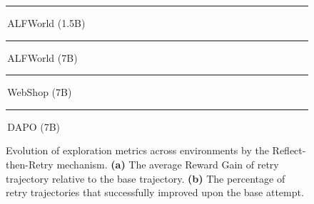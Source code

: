 \begin{figure}
    \vspace{0.4em}
    {\scriptsize
    \textcolor{blue}{\rule[0.35ex]{1.1em}{1.3pt}}\,ALFWorld (1.5B)\quad
    \textcolor{red}{\rule[0.35ex]{1.1em}{1.3pt}}\,ALFWorld (7B)\par
    \textcolor{green!70!black}{\rule[0.35ex]{1.1em}{1.3pt}}\,WebShop (7B)\quad
    \textcolor{orange}{\rule[0.35ex]{1.1em}{1.3pt}}\,DAPO (7B)\par}

    \caption{Evolution of exploration metrics across environments by the Reflect-then-Retry mechanism. \textbf{(a)} The average Reward Gain of retry trajectory relative to the base trajectory. \textbf{(b)} The percentage of retry trajectories that successfully improved upon the base attempt.}
    \label{fig:exploration_metrics}
\end{figure}
